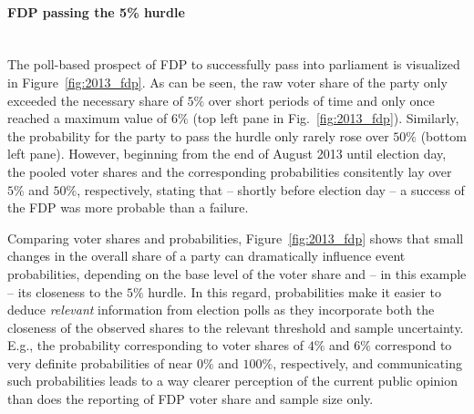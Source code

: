 \documentclass[smallcondensed]{svjour3}     %
\begin{document}
\paragraph{FDP passing the 5\% hurdle} \ \\
The poll-based prospect of FDP to successfully pass into parliament is visualized
in Figure~\ref{fig:2013_fdp}.
As can be seen, the raw voter share of the party only exceeded the necessary share
of $5\%$ over short periods of time and only once reached a maximum value
of $6\%$ (top left pane in Fig.~\ref{fig:2013_fdp}). Similarly, the probability
for the party to pass the hurdle only rarely rose over $50\%$ (bottom left pane).
However, beginning
from the end of August 2013 until election day, the pooled voter shares and the
corresponding probabilities consitently lay over $5\%$ and $50\%$, respectively,
stating that -- shortly before election day -- a success of the FDP was more
probable than a failure.

Comparing voter shares and probabilities, Figure~\ref{fig:2013_fdp} shows
that small changes in the overall share of a party can dramatically influence
event probabilities, depending on the base level of the voter share and
-- in this example -- its closeness to the $5\%$ hurdle.
In this regard, probabilities make it easier to deduce {\it relevant} information
from election polls as they incorporate both the closeness of the observed shares
to the relevant threshold and sample uncertainty.
E.g., the probability corresponding to voter shares of $4\%$ and $6\%$ correspond to
very definite probabilities of near $0\%$ and $100\%$, respectively,
and communicating such probabilities leads to a way clearer perception of
the current public opinion than does the reporting of FDP voter share and sample size only.
\end{document}
